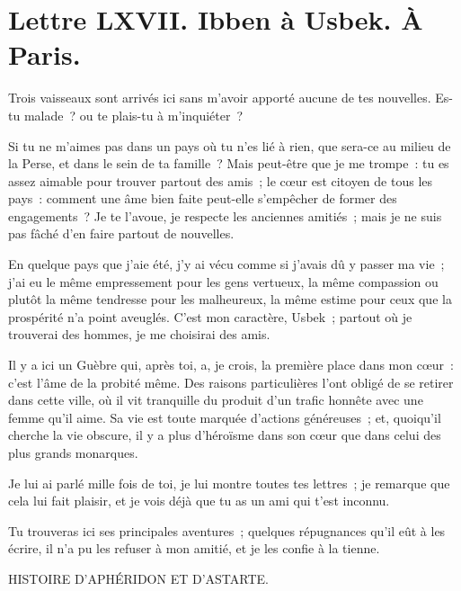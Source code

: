 \documentclass[french,twoside]{book} %
\newcommand{\dateline}[1]{\medskip{\RaggedLeft{#1}\par}\bigskip}
\begin{document}
\dateline{À Paris, le 8 de la lune de Chahban 1714.}
\section[{Lettre LXVII. Ibben à Usbek. À Paris.}]{Lettre LXVII. Ibben à Usbek. À Paris.}\renewcommand{\leftmark}{Lettre LXVII. Ibben à Usbek. À Paris.}

\noindent Trois vaisseaux sont arrivés ici sans m’avoir apporté aucune de tes nouvelles. Es-tu malade ? ou te plais-tu à m’inquiéter ?\par
Si tu ne m’aimes pas dans un pays où tu n’es lié à rien, que sera-ce au milieu de la Perse, et dans le sein de ta famille ? Mais peut-être que je me trompe : tu es assez aimable pour trouver partout des amis ; le cœur est citoyen de tous les pays : comment une âme bien faite peut-elle s’empêcher de former des engagements ? Je te l’avoue, je respecte les anciennes amitiés ; mais je ne suis pas fâché d’en faire partout de nouvelles.\par
En quelque pays que j’aie été, j’y ai vécu comme si j’avais dû y passer ma vie ; j’ai eu le même empressement pour les gens vertueux, la même compassion ou plutôt la même tendresse pour les malheureux, la même estime pour ceux que la prospérité n’a point aveuglés. C’est mon caractère, Usbek ; partout où je trouverai des hommes, je me choisirai des amis.\par
Il y a ici un Guèbre qui, après toi, a, je crois, la première place dans mon cœur : c’est l’âme de la probité même. Des raisons particulières l’ont obligé de se retirer dans cette ville, où il vit tranquille du produit d’un trafic honnête avec une femme qu’il aime. Sa vie est toute marquée d’actions généreuses ; et, quoiqu’il cherche la vie obscure, il y a plus d’héroïsme dans son cœur que dans celui des plus grands monarques.\par
Je lui ai parlé mille fois de toi, je lui montre toutes tes lettres ; je remarque que cela lui fait plaisir, et je vois déjà que tu as un ami qui t’est inconnu.\par
Tu trouveras ici ses principales aventures ; quelques répugnances qu’il eût à les écrire, il n’a pu les refuser à mon amitié, et je les confie à la tienne.\par

\begin{center}
\noindent \centerline{HISTOIRE D’APHÉRIDON ET D’ASTARTE.}\par
\end{center}
\end{document}
